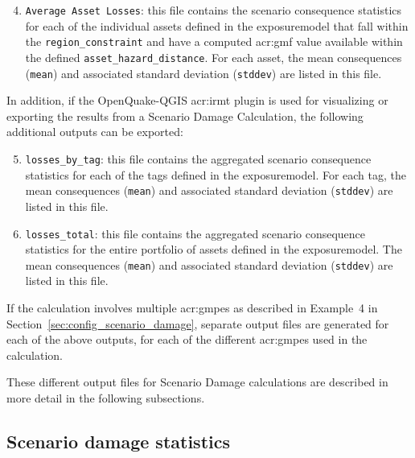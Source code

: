 \begin{enumerate}
\setcounter{enumi}{3}

  \item \Verb+Average Asset Losses+: this file contains the scenario consequence
    statistics for each of the individual \glspl{asset} defined in the
    \gls{exposuremodel} that fall within the \Verb+region_constraint+ and have
    a computed \gls{acr:gmf} value available within the defined
    \Verb+asset_hazard_distance+. For each \gls{asset}, the mean consequences
    (\Verb+mean+) and associated standard deviation (\Verb+stddev+) are listed
    in this file.

\end{enumerate}

In addition, if the OpenQuake-QGIS \gls{acr:irmt} plugin is used for
visualizing or exporting the results from a Scenario Damage Calculation, the
following additional outputs can be exported:

\begin{enumerate}
\setcounter{enumi}{4}

  \item \Verb+losses_by_tag+: this file contains the aggregated scenario
    consequence statistics for each of the \glspl{tag} defined in the
    \gls{exposuremodel}. For each \gls{tag}, the mean consequences
    (\Verb+mean+) and associated standard deviation (\Verb+stddev+) are listed
    in this file.

  \item \Verb+losses_total+: this file contains the aggregated scenario
    consequence statistics for the entire portfolio of \glspl{asset} defined
    in the \gls{exposuremodel}. The mean consequences (\Verb+mean+) and 
    associated standard deviation (\Verb+stddev+) are listed in this file.

\end{enumerate}

If the calculation involves multiple \glspl{acr:gmpe} as described in
Example~4 in Section~\ref{sec:config_scenario_damage}, separate output files
are generated for each of the above outputs, for each of the different
\glspl{acr:gmpe} used in the calculation.

These different output files for Scenario Damage calculations are described in
more detail in the following subsections.


\subsection{Scenario damage statistics}
\label{subsec:scenario_damage_statistics}

